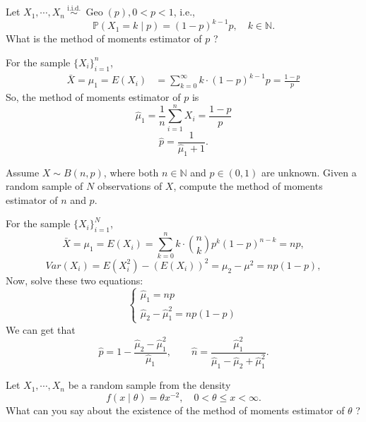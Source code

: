 \documentclass[12pt]{article}
\begin{document}
    \begin{exercise}
        Let \(X_{1}, \cdots, X_{n} \stackrel{\text { i.i.d. }}{\sim} \operatorname{Geo}(p), 0<p<1\), i.e.,
        \[
        \mathbb{P}\left(X_{1}=k \mid p\right)=(1-p)^{k-1} p, \quad k \in \mathbb{N} .
        \]
        What is the method of moments estimator of \(p\) ?
    \end{exercise}

    \begin{solution}
        For the sample \(\{X_i\}_{i=1}^n\), 
        \[
            \begin{aligned}
                \bar{X}=\mu_1=E(X_i)&=\sum_{k=0}^\infty k\cdot (1-p)^{k-1}p=\frac{1-p}{p}
            \end{aligned}
        \]
        So, the method of moments estimator of $p$ is 
        \[
            \hat{\mu}_1=\frac{1}{n}\sum_{i=1}^nX_i=\frac{1-p}{p}
        \]
        \[
            \hat{p}=\frac{1}{\hat{\mu}_1+1}. 
        \]
    \end{solution}
        
    \begin{exercise}
        Assume \(X \sim B(n, p)\), where both \(n \in \mathbb{N}\) and \(p \in(0,1)\) are unknown. Given a random sample of \(N\) observations of \(X\), compute the method of moments estimator of \(n\) and \(p\).
    \end{exercise}

    \begin{solution}
        For the sample \(\{X_i\}_{i=1}^N\), 
        \[
            \bar{X}=\mu_1=E(X_i)=\sum_{k=0}^nk\cdot \binom{n}{k}p^k(1-p)^{n-k}=np, 
        \]
        \[
            Var(X_i)=E(X_i^2)-(E(X_i))^2=\mu_2-\mu^2=np(1-p), 
        \]
        Now, solve these two equations: 
        \[
            \left\{\begin{array}{l}
                \hat{\mu}_1=np\\
                \hat{\mu}_2-\hat{\mu}_1^2=np(1-p)
            \end{array}\right.
        \]
        We can get that
        \[
            \hat{p}=1-\frac{\hat{\mu}_2-\hat{\mu}_1^2}{\hat{\mu}_1},\qquad\hat{n}=\frac{\hat{\mu}_1^2}{\hat{\mu}_1-\hat{\mu}_2+\hat{\mu}_1^2}. 
        \]
    \end{solution}

    \begin{exercise}
        Let \(X_{1}, \cdots, X_{n}\) be a random sample from the density
        \[
        f(x \mid \theta)=\theta x^{-2}, \quad 0<\theta \leqslant x<\infty .
        \]
        What can you say about the existence of the method of moments estimator of \(\theta\) ?
    \end{exercise}
\end{document}
